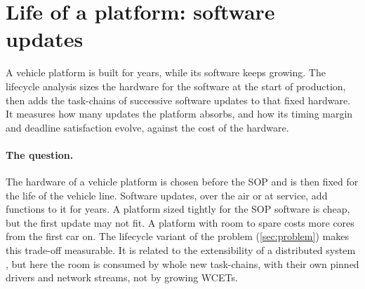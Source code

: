 \section{Life of a platform: software updates}
\label{sec:lifecycle}

\begin{inbrief}
A vehicle platform is built for years, while its software keeps growing.
The lifecycle analysis sizes the hardware for the software at the start of
production, then adds the task-chains of successive software updates to
that fixed hardware. It measures how many updates the platform absorbs, and
how its timing margin and deadline satisfaction evolve, against the cost of
the hardware.
\end{inbrief}

\paragraph{The question.} The hardware of a vehicle platform is chosen
before the SOP and is then fixed for the life of the vehicle line. Software
updates, over the air or at service, add functions to it for years. A
platform sized tightly for the SOP software is cheap, but the first update
may not fit. A platform with room to spare costs more cores from the first
car on. The lifecycle variant of the problem (\cref{sec:problem}) makes
this trade-off measurable. It is related to the extensibility of a
distributed system \cite{zhu2009optimizing}, but here the room is consumed
by whole new task-chains, with their own pinned drivers and network
streams, not by growing WCETs.

